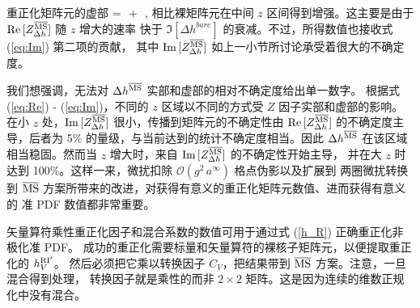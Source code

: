 重正化矩阵元的虚部
\be
\label{eq:Im}
=\,\, +\,\, ,
\ee
相比裸矩阵元在中间 $z$ 区间得到增强。这主要是由于 ${\rm Re}\,[Z_{\Delta h}^{{\overline{\rm MS}}}]$ 随 $z$ 增大的速率
快于 $\Im[\Delta h^{bare}]$ 的衰减。不过，所得数值也接收式 (\ref{eq:Im}) 第二项的贡献，
其中 ${\rm Im}\,[Z_{\Delta h}^{{\overline{\rm MS}}}]$ 如上一小节所讨论承受着很大的不确定度。

我们想强调，无法对 $\Delta h^{\overline{\rm MS}}$ 实部和虚部的相对不确定度给出单一数字。
根据式 (\ref{eq:Re}) - (\ref{eq:Im})，不同的 $z$ 区域以不同的方式受 $Z$ 因子实部和虚部的影响。
在小 $z$ 处，${\rm Im}\,[Z_{\Delta h}^{{\overline{\rm MS}}}]$ 很小，传播到矩阵元的不确定性由 ${\rm Re}\,[Z_{\Delta h}^{{\overline{\rm MS}}}]$
的不确定度主导，后者为 5\% 的量级，与当前达到的统计不确定度相当。因此 $\Delta h^{\overline{\rm MS}}$
在该区域相当稳固。然而当 $z$ 增大时，来自 ${\rm Im}\,[Z_{\Delta h}^{{\overline{\rm MS}}}]$ 的不确定性开始主导，
并在大 $z$ 时达到 100\%。这样一来，微扰扣除 $\mathcal{O}(g^2\,a^\infty)$ 格点伪影以及扩展到
两圈微扰转换到 ${\overline{\rm MS}}$ 方案所带来的改进，对获得有意义的重正化矩阵元数值、进而获得有意义的
准 PDF 数值都非常重要。

\vspace*{0.5cm}
矢量算符乘性重正化因子和混合系数的数值可用于通过式 (\ref{h_R}) 正确重正化非极化准 PDF。
成功的重正化需要标量和矢量算符的裸核子矩阵元，以便提取重正化的 $h_V^{\rm RI'}$。
然后必须把它乘以转换因子 $C_V$，把结果带到 ${\overline{\rm MS}}$ 方案。注意，一旦混合得到处理，
转换因子就是乘性的而非 $2{\times}2$ 矩阵。这是因为连续的维数正规化中没有混合。


